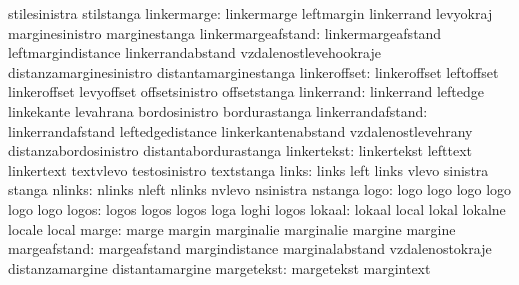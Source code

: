                            stilesinistra             stilstanga
              linkermarge: linkermarge               leftmargin
                           linkerrand                levyokraj
                           marginesinistro           marginestanga
       linkermargeafstand: linkermargeafstand        leftmargindistance
                           linkerrandabstand         vzdalenostlevehookraje
                           distanzamarginesinistro   distantamarginestanga
             linkeroffset: linkeroffset              leftoffset
                           linkeroffset              levyoffset
                           offsetsinistro            offsetstanga
               linkerrand: linkerrand                leftedge
                           linkekante                levahrana
                           bordosinistro             bordurastanga
        linkerrandafstand: linkerrandafstand         leftedgedistance
                           linkerkantenabstand       vzdalenostlevehrany
                           distanzabordosinistro     distantabordurastanga
              linkertekst: linkertekst               lefttext
                           linkertext                textvlevo
                           testosinistro             textstanga %
                    links: links                     left
                           links                     vlevo
                           sinistra                  stanga
                   nlinks: nlinks                    nleft
                           nlinks                    nvlevo
                           nsinistra                 nstanga
                     logo: logo                      logo
                           logo                      logo
                           logo                      logo
                    logos: logos                     logos
                           logos                     loga
                           loghi                     logos
                   lokaal: lokaal                    local
                           lokal                     lokalne
                           locale                    local
                    marge: marge                     margin
                           marginalie                marginalie
                           margine                   margine
             margeafstand: margeafstand              margindistance
                           marginalabstand           vzdalenostokraje
                           distanzamargine           distantamargine
               margetekst: margetekst                margintext
